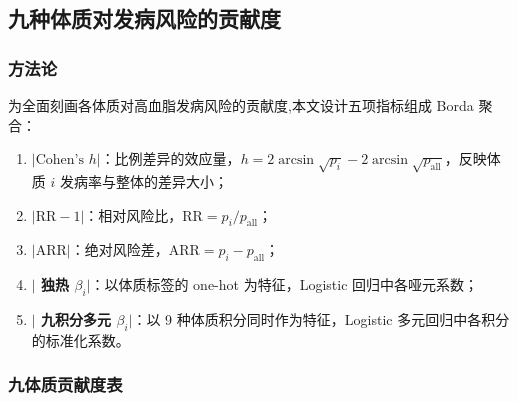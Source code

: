 \documentclass{MathorCupmodeling}
\providecommand{\tightlist}{%
  \setlength{\itemsep}{0pt}\setlength{\parskip}{0pt}}
\begin{document}
\subsection{九种体质对发病风险的贡献度}

\subsubsection{方法论}

为全面刻画各体质对高血脂发病风险的贡献度,本文设计五项指标组成 Borda 聚合：

\begin{enumerate}
\def\labelenumi{(\arabic{enumi})}
\tightlist
\item \textbf{$|\text{Cohen's } h|$}：比例差异的效应量，$h = 2\arcsin\sqrt{p_i} - 2\arcsin\sqrt{p_{\text{all}}}$，反映体质 $i$ 发病率与整体的差异大小；
\item \textbf{$|\text{RR} - 1|$}：相对风险比，$\text{RR} = p_i / p_{\text{all}}$；
\item \textbf{$|\text{ARR}|$}：绝对风险差，$\text{ARR} = p_i - p_{\text{all}}$；
\item \textbf{$|$ 独热 $\beta_i|$}：以体质标签的 one-hot 为特征，Logistic 回归中各哑元系数；
\item \textbf{$|$ 九积分多元 $\beta_i|$}：以 9 种体质积分同时作为特征，Logistic 多元回归中各积分的标准化系数。
\end{enumerate}

\subsubsection{九体质贡献度表}
\end{document}

